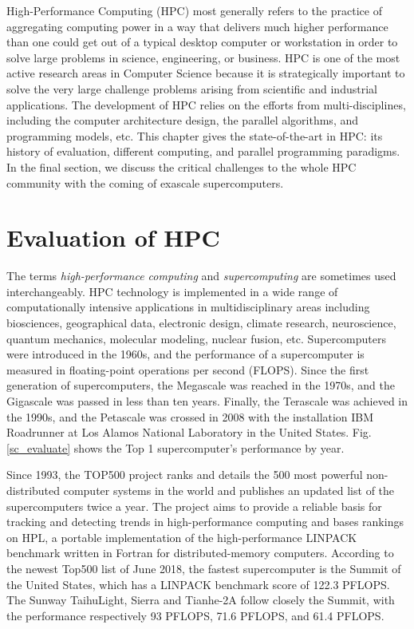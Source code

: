 \begin{displayquote}
	\textsf{High-Performance Computing (HPC) most generally refers to the practice of aggregating computing power in a way that delivers much higher performance than one could get out of a typical desktop computer or workstation in order to solve large problems in science, engineering, or business. HPC is one of the most active research areas in Computer Science because it is strategically important to solve the very large challenge problems arising from scientific and industrial applications. The development of HPC relies on the efforts from multi-disciplines, including the computer architecture design, the parallel algorithms, and programming models, etc. This chapter gives the state-of-the-art in HPC: its history of evaluation, different computing, and parallel programming paradigms. In the final section, we discuss the critical challenges to the whole HPC community with the coming of exascale supercomputers.}
\end{displayquote}

\vspace{0.6in}

\section{Evaluation of HPC}

The terms \textit{high-performance computing} and \textit{supercomputing} are sometimes used interchangeably. HPC technology is implemented in a wide range of computationally intensive applications in multidisciplinary areas including biosciences, geographical data, electronic design, climate research, neuroscience, quantum mechanics, molecular modeling, nuclear fusion, etc. Supercomputers were introduced in the 1960s, and the performance of a supercomputer is measured in floating-point operations per second (FLOPS). Since the first generation of supercomputers, the Megascale was reached in the 1970s, and the Gigascale was passed in less than ten years. Finally, the Terascale was achieved in the 1990s, and the Petascale was crossed in 2008 with the installation IBM Roadrunner at Los Alamos National Laboratory in the United States. Fig. \ref{sc_evaluate} shows the Top 1 supercomputer's performance by year.

Since 1993, the TOP500 project ranks and details the 500 most powerful non-distributed computer systems in the world and publishes an updated list of the supercomputers twice a year. The project aims to provide a reliable basis for tracking and detecting trends in high-performance computing and bases rankings on HPL, a portable implementation of the high-performance LINPACK benchmark written in Fortran for distributed-memory computers. According to the newest Top500 list of June 2018, the fastest supercomputer is the Summit of the United States, which has a LINPACK benchmark score of 122.3 PFLOPS. The Sunway TaihuLight, Sierra and Tianhe-2A follow closely the Summit, with the performance respectively 93 PFLOPS, 71.6 PFLOPS, and 61.4 PFLOPS. 

